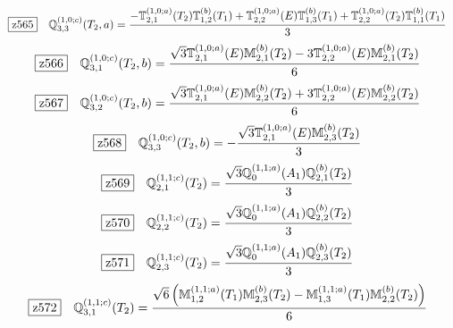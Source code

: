 \documentclass[fleqn,10pt,landscape]{jsarticle}
\begin{document}
\begin{dmath*}
\hspace*{3mm}\fbox{z565}\quad \mathbb{Q}_{3,3}^{(1,0;c)}(T_{2},a)=\frac{- \mathbb{T}_{2,1}^{(1,0;a)}(T_{2}) \mathbb{T}_{1,2}^{(b)}(T_{1}) + \mathbb{T}_{2,2}^{(1,0;a)}(E) \mathbb{T}_{1,3}^{(b)}(T_{1}) + \mathbb{T}_{2,2}^{(1,0;a)}(T_{2}) \mathbb{T}_{1,1}^{(b)}(T_{1})}{3}
\end{dmath*}
\begin{dmath*}
\hspace*{3mm}\fbox{z566}\quad \mathbb{Q}_{3,1}^{(1,0;c)}(T_{2},b)=\frac{\sqrt{3} \mathbb{T}_{2,1}^{(1,0;a)}(E) \mathbb{M}_{2,1}^{(b)}(T_{2}) - 3 \mathbb{T}_{2,2}^{(1,0;a)}(E) \mathbb{M}_{2,1}^{(b)}(T_{2})}{6}
\end{dmath*}
\begin{dmath*}
\hspace*{3mm}\fbox{z567}\quad \mathbb{Q}_{3,2}^{(1,0;c)}(T_{2},b)=\frac{\sqrt{3} \mathbb{T}_{2,1}^{(1,0;a)}(E) \mathbb{M}_{2,2}^{(b)}(T_{2}) + 3 \mathbb{T}_{2,2}^{(1,0;a)}(E) \mathbb{M}_{2,2}^{(b)}(T_{2})}{6}
\end{dmath*}
\begin{dmath*}
\hspace*{3mm}\fbox{z568}\quad \mathbb{Q}_{3,3}^{(1,0;c)}(T_{2},b)=- \frac{\sqrt{3} \mathbb{T}_{2,1}^{(1,0;a)}(E) \mathbb{M}_{2,3}^{(b)}(T_{2})}{3}
\end{dmath*}
\begin{dmath*}
\hspace*{3mm}\fbox{z569}\quad \mathbb{Q}_{2,1}^{(1,1;c)}(T_{2})=\frac{\sqrt{3} \mathbb{Q}_{0}^{(1,1;a)}(A_{1}) \mathbb{Q}_{2,1}^{(b)}(T_{2})}{3}
\end{dmath*}
\begin{dmath*}
\hspace*{3mm}\fbox{z570}\quad \mathbb{Q}_{2,2}^{(1,1;c)}(T_{2})=\frac{\sqrt{3} \mathbb{Q}_{0}^{(1,1;a)}(A_{1}) \mathbb{Q}_{2,2}^{(b)}(T_{2})}{3}
\end{dmath*}
\begin{dmath*}
\hspace*{3mm}\fbox{z571}\quad \mathbb{Q}_{2,3}^{(1,1;c)}(T_{2})=\frac{\sqrt{3} \mathbb{Q}_{0}^{(1,1;a)}(A_{1}) \mathbb{Q}_{2,3}^{(b)}(T_{2})}{3}
\end{dmath*}
\begin{dmath*}
\hspace*{3mm}\fbox{z572}\quad \mathbb{Q}_{3,1}^{(1,1;c)}(T_{2})=\frac{\sqrt{6} \left(\mathbb{M}_{1,2}^{(1,1;a)}(T_{1}) \mathbb{M}_{2,3}^{(b)}(T_{2}) - \mathbb{M}_{1,3}^{(1,1;a)}(T_{1}) \mathbb{M}_{2,2}^{(b)}(T_{2})\right)}{6}
\end{dmath*}
\end{document}
